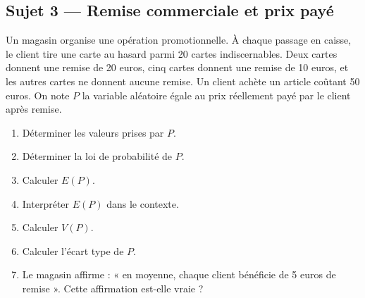 \subsection*{Sujet 3 — Remise commerciale et prix payé}

Un magasin organise une opération promotionnelle. À chaque passage en caisse, le client tire une carte au hasard parmi 20 cartes indiscernables.
Deux cartes donnent une remise de 20 euros, cinq cartes donnent une remise de 10 euros, et les autres cartes ne donnent aucune remise.
Un client achète un article coûtant 50 euros. On note $P$ la variable aléatoire égale au prix réellement payé par le client après remise.

\begin{enumerate}
\item Déterminer les valeurs prises par $P$.
\item Déterminer la loi de probabilité de $P$.
\item Calculer $E(P)$.
\item Interpréter $E(P)$ dans le contexte.
\item Calculer $V(P)$.
\item Calculer l'écart type de $P$.
\item Le magasin affirme : « en moyenne, chaque client bénéficie de 5 euros de remise ». Cette affirmation est-elle vraie ?
\end{enumerate}
